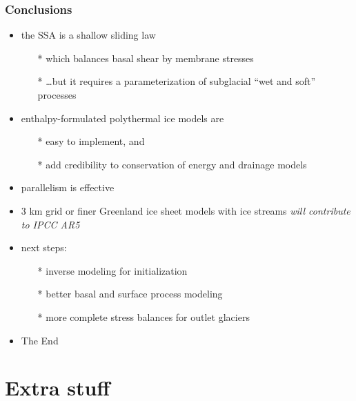 \documentclass{beamer}
\begin{document}
\begin{frame}
  \frametitle{Conclusions}

\begin{itemize}
\item the SSA is a shallow sliding law
  \begin{itemize}\small
  \item[*] which balances basal shear by membrane stresses
  \item[*] \dots but it requires a parameterization of subglacial ``wet and soft'' processes
  \end{itemize}\normalsize
\item enthalpy-formulated polythermal ice models are
  \begin{itemize}\small
  \item[*] easy to implement, and
  \item[*] add credibility to conservation of energy and drainage models
  \end{itemize}\normalsize
\item parallelism is effective
\item 3 km grid or finer Greenland ice sheet models with ice streams \emph{will contribute to IPCC AR5}
\item next steps:
  \begin{itemize}\small
  \item[*] inverse modeling for initialization
  \item[*] better basal and surface process modeling
  \item[*] more complete stress balances for outlet glaciers
  \end{itemize}
\item \alert{The End}
\end{itemize}
\end{frame}


\section*{Extra stuff}\subsection*{}
\end{document}

